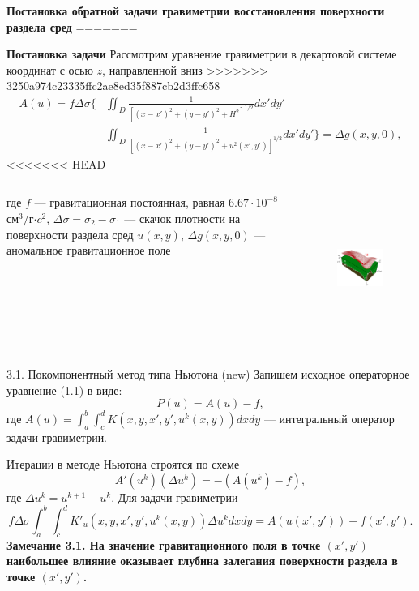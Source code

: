 \documentclass[10pt,pdf, mathserif, hyperref={unicode}]{beamer}
\begin{document}
\begin{frame}{\small\textbf{Постановка обратной задачи гравиметрии восстановления поверхности раздела сред}}
=======
\begin{frame}{\small\textbf{Постановка задачи}}
	Рассмотрим уравнение гравиметрии в декартовой системе координат с осью $z$, направленной вниз 
>>>>>>> 3250a974c23335ffc2ae8ed35f887cb2d3ffc658
	\begin{equation*}
	\begin{aligned}
	A(u)=f\Delta\sigma \bigg\{ &\iint_{D} \frac{1}{[(x-x')^2+(y-y')^2+H^2]^{1/2}}dx'dy' \\
	- &\iint_{D} \frac{1}{[(x-x')^2+(y-y')^2+u^2(x',y')]^{1/2}}dx'dy'\bigg\}=\Delta g(x,y,0),
	\end{aligned} 
	\end{equation*}
<<<<<<< HEAD
	\begin{columns}
		где $f$ --- гравитационная постоянная, равная $6.67\cdot10^{-8}$ см$^3/$г$\cdot c^2$, $\Delta\sigma=\sigma_2-\sigma_1$ --- скачок плотности на поверхности раздела сред $u(x,y)$, $\Delta g(x,y,0)$ --- аномальное гравитационное поле%
		\begin{figure}[h]
			\centering
			\includegraphics[height=4cm]{grav_illust.png}
			\label{fig:twolayer}
		\end{figure}
	\end{columns}
\end{frame}

\begin{frame}{3.1. Покомпонентный метод типа Ньютона (new)}
	Запишем исходное операторное уравнение (1.1) в виде:
	$$P(u)=A(u)-f,$$
	где $A(u)=\int_{a}^{b}\int_{c}^{d}K(x,y, x',y',u^k(x,y))dxdy$ --- интегральный оператор задачи гравиметрии.
	
	Итерации в методе Ньютона строятся по схеме
	$$A'(u^k)(\Delta u^k)=-(A(u^k)-f),$$ где $\Delta u^k=u^{k+1}-u^k$.
	Для задачи гравиметрии
	$$f\Delta\sigma\int_{a}^{b}\int_{c}^{d}K'_u(x,y, x',y',u^k(x,y))\Delta u^k dxdy=A(u(x',y'))-f(x',y').$$
\textbf{\color{blue} Замечание 3.1. На значение гравитационного поля в точке $(x',y')$ наибольшее влияние оказывает глубина залегания поверхности раздела в точке $(x',y')$.} 


\end{frame}
\end{frame}
\end{document}
